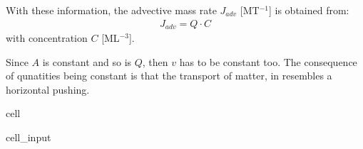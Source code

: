 \documentclass[letterpaper,10pt,english]{jupyterBook}
\begin{document}
\sphinxAtStartPar
With these information, the advective mass rate \(J_{adv}\) {[}MT\(^{-1}\){]} is obtained from:
\begin{equation*}
\begin{split}
J_{adv} = Q\cdot C
\end{split}
\end{equation*}
\sphinxAtStartPar
with concentration \(C\) {[}ML\(^{-3}\){]}.

\sphinxAtStartPar
Since \(A\) is constant and so is \(Q\), then \(v\) has to be constant too. The consequence of qunatities being constant is that the transport of matter, in  resembles a horizontal pushing.

\begin{sphinxuseclass}{cell}\begin{sphinxVerbatimInput}

\begin{sphinxuseclass}{cell_input}
\begin{sphinxVerbatim}[commandchars=\\\{\}]


   
   
   
     

   
   

  


\end{sphinxVerbatim}
\end{sphinxuseclass}
\end{sphinxVerbatimInput}
\end{sphinxuseclass}
\end{document}
